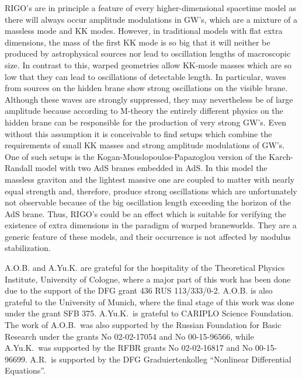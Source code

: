 \documentclass[a4paper,prl,twocolumn,amsmath,amssymb,showpacs]{revtex4}
\begin{document}
RIGO's are in principle a feature of every higher-dimensional spacetime model
as there will always occur amplitude modulations in GW's, which are a mixture
of a massless mode and KK modes. However, in traditional models with flat
extra dimensions, the mass of the first KK mode is so big that it will neither
be produced by astrophysical sources nor lead to oscillation lengths of
macroscopic size. In contrast to this, warped geometries allow KK-mode masses
which are so low that they can lead to oscillations of detectable length. In
particular, waves from sources on the hidden brane show strong oscillations on
the visible brane. Although these waves are strongly suppressed, they may
nevertheless be of large amplitude because according to M-theory the entirely
different physics on the hidden brane can be responsible for the production of
very strong GW's. Even without this assumption it is conceivable to find
set\-ups which combine the requirements of small KK masses and strong
amplitude modulations of GW's.  One of such set\-ups is the
Kogan-Mouslopoulos-Papazoglou version \cite{KMP} of the Karch-Randall model
\cite{KR} with two AdS\coordHE{} branes embedded in AdS\coordHE{}.  In this model the
massless graviton and the lightest massive one are coupled to matter with
nearly equal strength and, therefore, produce strong oscillations which are
unfortunately not observable because of the big oscillation length exceeding
the horizon of the AdS brane. Thus, RIGO's could be an effect which is
suitable for verifying the existence of extra dimensions in the paradigm of
warped braneworlds. They are a generic feature of these models, and their
occurrence is not affected by modulus stabilization.
 
A.O.B. and A.Yu.K. are grateful for the 
hospitality of the Theoretical Physics Institute, 
University of Cologne, where  
a major part of this work has been done due to the support of the DFG grant  
436 RUS 113/333/0-2. A.O.B. is also grateful to the University of Munich,
where the final stage of this work was done under the grant SFB 375. 
A.Yu.K.\ is grateful to CARIPLO Science Foundation.  
The work of A.O.B.\ was also supported by the Russian  
Foundation for Basic Research under the grants No 02-02-17054 and  
No 00-15-96566, while  
A.Yu.K.\ was supported by the RFBR grants No 02-02-16817 and No 00-15-96699. 
 A.R.\ is supported by the DFG Graduiertenkolleg  
``Nonlinear Differential Equations''. 
 
\end{document}
